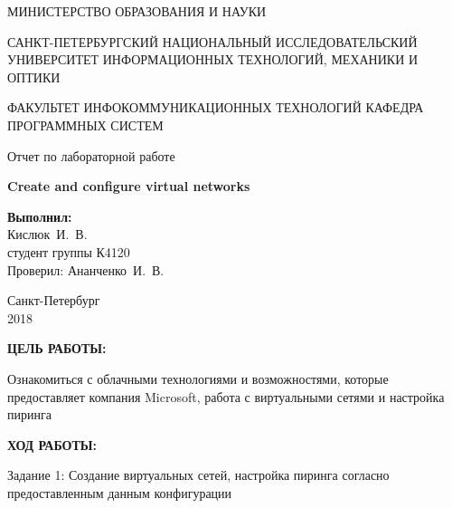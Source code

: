 \documentclass[14pt,a4paper]{extreport}
\newcommand{\header}[1]{%
{
\fontsize{16pt}{14pt}\selectfont
\begin{center}
\textbf{\MakeUppercase{#1}:}
\end{center}
}
}
\newcommand{\prepod}{Ананченко~И.~В.}
\newcommand{\igork}{Кислюк~И.~В.}
\begin{document}
	\begin{titlepage}
	\begin{center}	
		\fontsize{14pt}{14pt}\selectfont
		МИНИСТЕРСТВО ОБРАЗОВАНИЯ И НАУКИ\\

		\vspace*{0.6\baselineskip}
		
		САНКТ-ПЕТЕРБУРГСКИЙ НАЦИОНАЛЬНЫЙ ИССЛЕДОВАТЕЛЬСКИЙ УНИВЕРСИТЕТ ИНФОРМАЦИОННЫХ ТЕХНОЛОГИЙ, МЕХАНИКИ И ОПТИКИ
		
		\vspace*{0.6\baselineskip}
		ФАКУЛЬТЕТ ИНФОКОММУНИКАЦИОННЫХ ТЕХНОЛОГИЙ
		КАФЕДРА ПРОГРАММНЫХ СИСТЕМ
	
		\vspace*{7\baselineskip}
		\fontsize{19pt}{18pt}\selectfont
		Отчет по лабораторной работе
		
		\fontsize{20pt}{18pt}\selectfont
		\textbf{Create and configure virtual networks}\\
		\vspace*{1.15\baselineskip}
		\end{center}
	
	\vspace*{2\baselineskip}
	\begin{flushright}
	\fontsize{14pt}{14pt}\selectfont
	\textbf{Выполнил:}\\
	\igork\\
	студент группы К4120\\
	Проверил: \prepod\\
	\end{flushright}
	
	\vspace{\fill}
	\begin{center}
	Санкт-Петербург\\
	2018
	\end{center}
	
\end{titlepage}

\newpage

\header{Цель работы}

\fontsize{14pt}{14pt}\selectfont

Ознакомиться с облачными технологиями и возможностями, которые предоставляет компания Microsoft, работа с виртуальными сетями и настройка пиринга
\clearpage

\header{Ход работы}

Задание 1: Создание виртуальных сетей, настройка пиринга согласно предоставленным данным конфигурации
\end{document}
